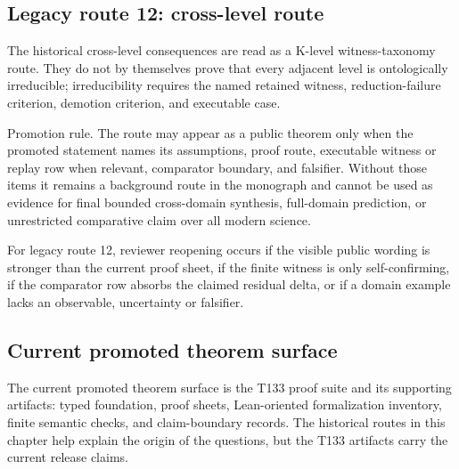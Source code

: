 \subsection{Legacy route 12: cross-level route}

The historical cross-level consequences are read as a K-level witness-taxonomy route. They do not by themselves prove that every adjacent level is ontologically irreducible; irreducibility requires the named retained witness, reduction-failure criterion, demotion criterion, and executable case.


Promotion rule. The route may appear as a public theorem only when the promoted statement names its assumptions, proof route, executable witness or replay row when relevant, comparator boundary, and falsifier. Without those items it remains a background route in the monograph and cannot be used as evidence for final bounded cross-domain synthesis, full-domain prediction, or unrestricted comparative claim over all modern science.


For legacy route 12, reviewer reopening occurs if the visible public wording is stronger than the current proof sheet, if the finite witness is only self-confirming, if the comparator row absorbs the claimed residual delta, or if a domain example lacks an observable, uncertainty or falsifier.


\subsection{Current promoted theorem surface}

The current promoted theorem surface is the T133 proof suite and its supporting artifacts: typed foundation, proof sheets, Lean-oriented formalization inventory, finite semantic checks, and claim-boundary records. The historical routes in this chapter help explain the origin of the questions, but the T133 artifacts carry the current release claims.
